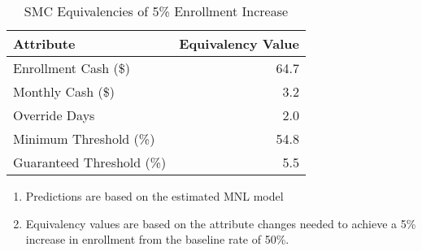 \begin{table}[H]
\centering
\caption{SMC Equivalencies of 5\% Enrollment Increase}
\setlength{\tabcolsep}{2.5em}

\newsavebox{\myTableBoxA}
\begin{lrbox}{\myTableBoxA}
\begin{tabular}{lr}
\toprule
\textbf{Attribute} & \textbf{Equivalency Value} \\
\midrule
Enrollment Cash (\$) & 64.7 \\
Monthly Cash (\$) & 3.2 \\
Override Days & 2.0 \\
Minimum Threshold (\%) & 54.8 \\
Guaranteed Threshold (\%) & 5.5 \\
\bottomrule
\end{tabular}
\end{lrbox}

\usebox{\myTableBoxA}

\vspace{0.5em}
\begin{minipage}{\wd\myTableBoxA}
\footnotesize
\begin{enumerate}[leftmargin=2em]  %
\item Predictions are based on the estimated MNL model
\item Equivalency values are based on the attribute changes needed to achieve a 5\% increase in enrollment from the baseline rate of 50\%.
\end{enumerate}
\end{minipage}
\label{table_smc_equiv}
\end{table}
